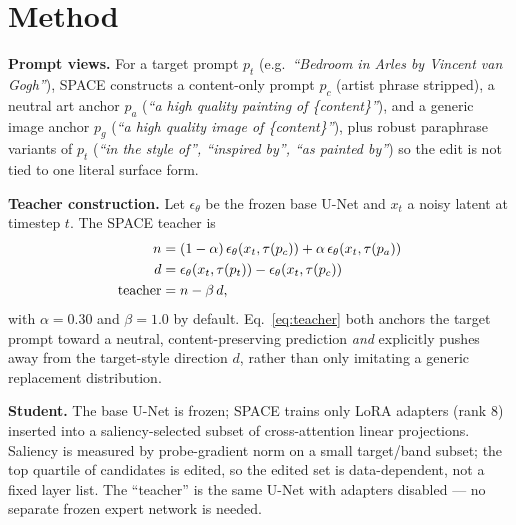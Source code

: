 \documentclass[10pt,twocolumn]{article}
\begin{document}
\section{Method}
\textbf{Prompt views.} For a target prompt $p_t$ (e.g.\ \emph{``Bedroom in Arles by Vincent van Gogh''}), SPACE constructs a content-only prompt $p_c$ (artist phrase stripped), a neutral art anchor $p_a$ (\emph{``a high quality painting of \{content\}''}), and a generic image anchor $p_g$ (\emph{``a high quality image of \{content\}''}), plus robust paraphrase variants of $p_t$ (\emph{``in the style of'', ``inspired by'', ``as painted by''}) so the edit is not tied to one literal surface form.

\textbf{Teacher construction.} Let $\epsilon_\theta$ be the frozen base U-Net and $x_t$ a noisy latent at timestep $t$. The SPACE teacher is
\begin{align}
n &= (1-\alpha)\,\epsilon_\theta(x_t,\tau(p_c)) + \alpha\,\epsilon_\theta(x_t,\tau(p_a)) \notag\\
d &= \epsilon_\theta(x_t,\tau(p_t)) - \epsilon_\theta(x_t,\tau(p_c)) \notag\\
\text{teacher} &= n - \beta\, d, \label{eq:teacher}
\end{align}
with $\alpha{=}0.30$ and $\beta{=}1.0$ by default. Eq.~\ref{eq:teacher} both anchors the target prompt toward a neutral, content-preserving prediction \emph{and} explicitly pushes away from the target-style direction $d$, rather than only imitating a generic replacement distribution.

\textbf{Student.} The base U-Net is frozen; SPACE trains only LoRA adapters (rank 8) inserted into a saliency-selected subset of cross-attention linear projections. Saliency is measured by probe-gradient norm on a small target/band subset; the top quartile of candidates is edited, so the edited set is data-dependent, not a fixed layer list. The ``teacher'' is the same U-Net with adapters disabled --- no separate frozen expert network is needed.
\end{document}
